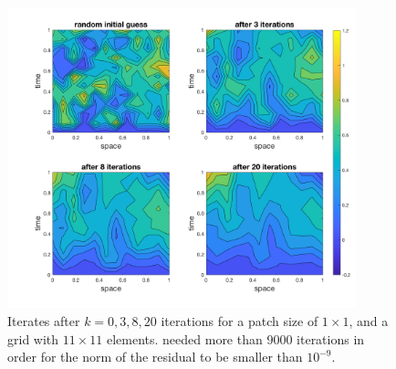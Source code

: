\documentclass[../draft_1.tex]{subfiles}
\begin{document}

\begin{figure}[ht!]
	\centering
	\includegraphics[width=0.9\textwidth]{images/implementation/contour_plot_1_blk_size1by1}
	\caption{Iterates after $k = 0,3,8, 20$ iterations for a patch size of $1 \times 1$, and a grid with $11 \times 11$ elements. needed more than 9000 iterations in order for the norm of the residual to be smaller than $ 10^{-9}$. }
	\label{fig:smoother_1by1}
\end{figure}
\end{document}
